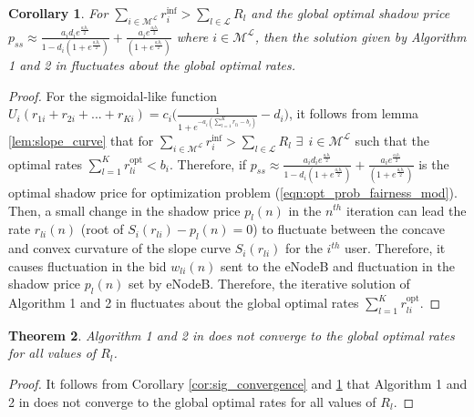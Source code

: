 \documentclass[journal]{IEEEtran} 		\usepackage{amsmath,amssymb}
\newtheorem{thm}{Theorem}[section]
\newtheorem{cor}[thm]{Corollary}
\begin{document}
\begin{cor}\label{cor:sig_fluctuate}
For $\sum_{i \in \mathcal{M}^{\mathcal{L}}}r_i^{\text{inf}}> \sum_{l \in \mathcal{L}}R_l$ and the global optimal shadow price $p_{ss} \approx \frac{a_id_i e^{\frac{a_ib_i}{2}}}{1-d_i(1+e^{\frac{a_ib_i}{2}})} + \frac{a_ie^{\frac{a_ib_i}{2}}}{(1+e^{\frac{a_ib_i}{2}})}$ where $i \in \mathcal{M}^{\mathcal{L}}$, then the solution given by Algorithm 1 and 2 in \cite{Ahmed_Utility4} fluctuates about the global optimal rates.
\end{cor}
\begin{proof}
For the sigmoidal-like function $U_i(r_{1i}+r_{2i}+ ...+r_{Ki}) = c_i\Big(\frac{1}{1+e^{-a_i(\sum_{l=1}^{K}r_{li}-b_i)}}-d_i\Big)$, it follows from lemma \ref{lem:slope_curve} that for  $\sum_{i \in \mathcal{M}^{\mathcal{L}}}r_i^{\text{inf}}> \sum_{l \in \mathcal{L}}R_l$  $\exists \:\: {i \in \mathcal{M}^{\mathcal{L}}}$ such that the optimal rates $\sum_{l=1}^{K}r_{li}^{\text{opt}} < b_i$. Therefore, if $p_{ss} \approx \frac{a_id_i e^{\frac{a_ib_i}{2}}}{1-d_i(1+e^{\frac{a_ib_i}{2}})} + \frac{a_ie^{\frac{a_ib_i}{2}}}{(1+e^{\frac{a_ib_i}{2}})}$ is the optimal shadow price for optimization problem (\ref{eqn:opt_prob_fairness_mod}). Then, a small change in the shadow price $p_l(n)$ in the $n^{th}$ iteration can lead the rate $r_{li}(n)$ (root of $S_i(r_{li}) - p_l(n) =0$) to fluctuate between the concave and convex curvature of the slope curve $S_i(r_{li})$ for the $i^{th}$ user. Therefore, it causes fluctuation in the bid $w_{li}(n)$ sent to the eNodeB and fluctuation in the shadow price $p_l(n)$ set by eNodeB.
Therefore, the iterative solution of Algorithm 1 and 2 in \cite{Ahmed_Utility4} fluctuates about the global optimal rates $\sum_{l=1}^{K}r_{li}^{\text{opt}}$.
\end{proof}
\begin{thm}\label{thm:sig_not_conv}
Algorithm 1 and 2 in \cite{Ahmed_Utility4} does not converge to the global optimal rates for all values of $R_l$.
\end{thm}
\begin{proof}
It follows from Corollary \ref{cor:sig_convergence} and \ref{cor:sig_fluctuate} that Algorithm 1 and 2 in \cite{Ahmed_Utility4} does not converge to the global optimal rates for all values of $R_l$.
\end{proof}
\end{document}
